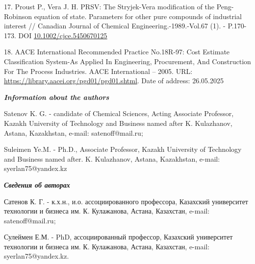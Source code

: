 \begin{refs}
17. Proust P., Vera J. H. PRSV: The Stryjek-Vera modification of the
Peng-Robinson equation of state. Parameters for other pure compounds of
industrial interest // Canadian Journal of Chemical
Engineering.-1989.-Vol.67 (1). - P.170-173. DOI
\href{https://doi.org/10.1002/cjce.5450670125}{10.1002/cjce.5450670125}

18. AACE International Recommended Practice No.18R-97: Cost Estimate
Classification System-As Applied In Engineering, Procurement, And
Construction For The Process Industries. AACE International -- 2005.
URL: \url{https://library.aacei.org/pgd01/pgd01.shtml}. Date of address:
26.05.2025
\end{refs}

\begin{info}
\emph{{\bfseries Information about the authors}}

Satenov K. G. - candidate of Chemical Sciences, Acting Associate
Professor, Kazakh University of Technology and Business named after K.
Kulazhanov, Astana, Kazakhstan, e-mail: satenoff@mail.ru;

Suleimen Ye.M. - Ph.D., Associate Professor, Kazakh University of
Technology and Business named after. K. Kulazhanov, Astana, Kazakhstan,
e-mail: syerlan75@yandex.kz

\emph{{\bfseries Сведения об авторах}}

Сатенов К. Г. - к.х.н., и.о. ассоциированного профессора, Казахский
университет технологии и бизнеса им. К. Кулажанова, Астана, Казахстан,
e-mail: satenoff@mail.ru;

Сулеймен Е.М. - PhD, ассоциированный профессор, Казахский университет
технологии и бизнеса им. К. Кулажанова, Астана, Казахстан, e-mail:
syerlan75@yandex.kz.
\end{info}
